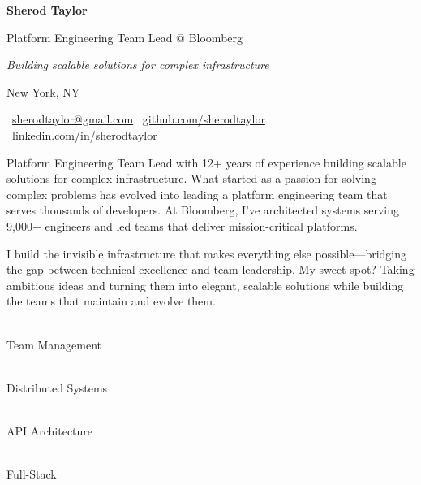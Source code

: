 \documentclass[11pt,a4paper]{article}
\newcommand{\highlightbox}[3]{
    \begin{minipage}[t]{0.22\textwidth}
        \centering
        {\small\textcolor{#2}{#1}} \\
        \vspace{0.2em}
        {\footnotesize\color{textgray} #3}
    \end{minipage}
}
\begin{document}
{\Large\bfseries\color{textdark} Sherod Taylor}

\vspace{0.1em}
{\normalsize\color{textgray} Platform Engineering Team Lead @ Bloomberg}

\vspace{0.1em}
{\small\color{textdark}\textit{Building scalable solutions for complex infrastructure}}

\vspace{0.1em}
{\small\color{textgray} New York, NY}

\vspace{0.3em}
{\scriptsize\color{accentblue}
    \faEnvelope\ \href{mailto:sherodtaylor@gmail.com}{sherodtaylor@gmail.com} \quad
    \faGithub\ \href{https://github.com/sherodtaylor}{github.com/sherodtaylor} \quad
    \faLinkedin\ \href{https://www.linkedin.com/in/sherodtaylor/}{linkedin.com/in/sherodtaylor}
}

\vspace{0.8em}


\vspace{0.3em}

{\small Platform Engineering Team Lead with 12+ years of experience building scalable solutions for complex infrastructure. What started as a passion for solving complex problems has evolved into leading a platform engineering team that serves thousands of developers. At Bloomberg, I've architected systems serving 9,000+ engineers and led teams that deliver mission-critical platforms.

I build the invisible infrastructure that makes everything else possible—bridging the gap between technical excellence and team leadership. My sweet spot? Taking ambitious ideas and turning them into elegant, scalable solutions while building the teams that maintain and evolve them.}

\vspace{1em}

\noindent%
\highlightbox{\faUsers}{highlightgreen}{Team Management}\hfill%
\highlightbox{\faServer}{highlightpurple}{Distributed Systems}\hfill%
\highlightbox{\faChartLine}{highlightorange}{API Architecture}\hfill%
\highlightbox{\faCode}{highlightcyan}{Full-Stack}

\vspace{0.3em}
\end{document}
